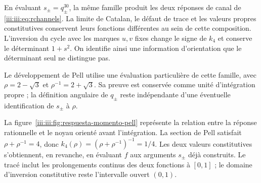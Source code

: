 En évaluant $s_\pm=q_\pm^{30}$, la même famille produit les deux réponses
de canal de \eqref{iii:iii:eq:rchannels}. La limite de Catalan, le défaut de
trace et les valeurs propres constitutives conservent leurs fonctions différentes
au sein de cette composition. L’inversion du cycle avec les marques $u,v$
fixes change le signe de $k_4$ et conserve le déterminant $1+s^2$.
On identifie ainsi une information d’orientation que le déterminant
seul ne distingue pas.

Le développement de Pell utilise une évaluation particulière de cette famille,
avec $\rho=2-\sqrt3$ et $\rho^{-1}=2+\sqrt3$. Sa preuve est conservée comme
unité d’intégration propre ; la définition angulaire de $q_\pm$ reste
indépendante d’une éventuelle identification de $s_\pm$ à $\rho$.

La figure~\ref{iii:iii:fig:respuesta-momento-pell} représente la relation entre
la réponse rationnelle et le noyau orienté avant l’intégration. La section
de Pell satisfait $\rho+\rho^{-1}=4$, donc
$k_4(\rho)=(\rho+\rho^{-1})^{-1}=1/4$. Les deux valeurs constitutives
s’obtiennent, en revanche, en évaluant $f$ aux arguments $s_\pm$ déjà
construits. Le tracé inclut les prolongements continus des deux
fonctions à $[0,1]$ ; le domaine d’inversion constitutive reste
l’intervalle ouvert $(0,1)$.

